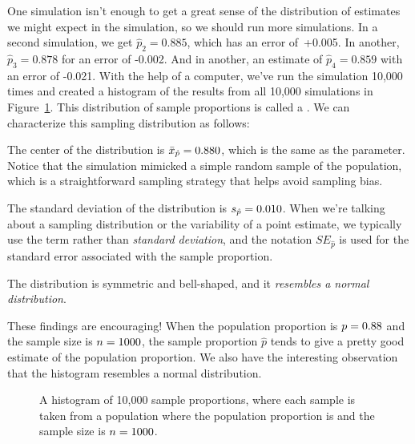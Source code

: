 One simulation isn't enough to get a great sense of the
distribution of estimates we might expect in the simulation,
so we should run more simulations.
In a second simulation,
we get $\hat{p}_2 = 0.885$, which has an error of~+0.005.
In another, $\hat{p}_3 = 0.878$ for an error of -0.002.
And in another,
an estimate of $\hat{p}_4 = 0.859$ with an error of -0.021.
With the help of a computer, we've run the simulation 10,000 times
and created a histogram of the results from all 10,000 simulations
in Figure~\ref{sampling_10k_prop_88p}. This
distribution of sample proportions is called a
.
We can characterize this sampling distribution as follows:
\begin{description}
\setlength{\itemsep}{0mm}
\item[Center.]
    The center of the distribution is
    $\bar{x}_{\hat{p}} = 0.88{}0$,
    which is the same as the parameter.
    Notice that the simulation mimicked a simple random sample
    of the population, which is a straightforward sampling
    strategy that helps avoid sampling bias.
\item[Spread.]
    The standard deviation of the distribution
    is $s_{\hat{p}} = 0.010{}$.
    When we're talking about
    a sampling distribution or the variability of
    a point estimate, we typically use the term
    rather than \emph{standard deviation},
    and the notation $SE_{\hat{p}}$ is used for the standard
    error associated with the sample proportion.
\item[Shape.]
    The distribution is symmetric and bell-shaped,
    and it \emph{resembles a normal distribution}.
\end{description}
These findings are encouraging!
When the population
proportion is $p = 0.88{}$ and the sample size is
$n = 1000{}$,
the sample proportion $\hat{p}$ tends to give
a pretty good estimate
of the population proportion.
We also have the interesting observation
that the histogram resembles a normal distribution.

\begin{figure}
   \centering
   \caption{A histogram of 10,000 sample proportions, where each
       sample is taken from a population where the population
       proportion is \pewsolarparprop{} and the sample size is
       $n = 1000{}$.}
   \label{sampling_10k_prop_88p}
\end{figure}

